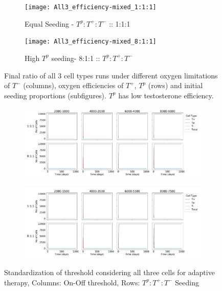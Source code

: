 \begin{figure}[h!]
  \centering
  \begin{subfigure}[b]{\textwidth}
    \centering
    \texttt{[image: All3\_efficiency-mixed\_1:1:1]}
    \caption{Equal Seeding - $T^p:T^+:T^-$ :: 1:1:1 }
    \label{fig_all3-mixed_1:1:1}
  \end{subfigure}
  \begin{subfigure}[b]{\textwidth}
    \centering
    \texttt{[image: All3\_efficiency-mixed\_8:1:1]}
    \caption{High $T^p$ seeding- 8:1:1 :: $T^p:T^+:T^-$}
    \label{fig_all3-mixed_8:1:1}
  \end{subfigure}
  \caption[Final ratio of all 3 cell types runs under different limitations for each cell type]{Final ratio of all 3 cell types runs under different oxygen limitations of $T^-$ (columns), oxygen efficiencies of $T^+$, $T^p$ (rows) and initial seeding proportions (subfigures). $T^p$ has low testosterone efficiency.}
  \label{fig_all3-mixed}
\end{figure}

\begin{figure}[h!]
  \centering
  \begin{subfigure}[b]{\textwidth}
    \centering
    \includegraphics[width=\textwidth]{figures/All3_therapy-standardization-total}
  \end{subfigure}
  \begin{subfigure}[b]{\textwidth}
    \centering
    \includegraphics[width=\textwidth]{figures/All3_therapy-standardization-total-sw}
  \end{subfigure}
  \caption[Standardization of threshold considering all 3 cells for adaptive therapy]{Standardization of threshold considering all three cells for adaptive therapy, Columns: On-Off threshold, Rows: $T^p:T^+:T^-$ Seeding}
  \label{fig_therapy-AT_standardization-Total}
\end{figure}
